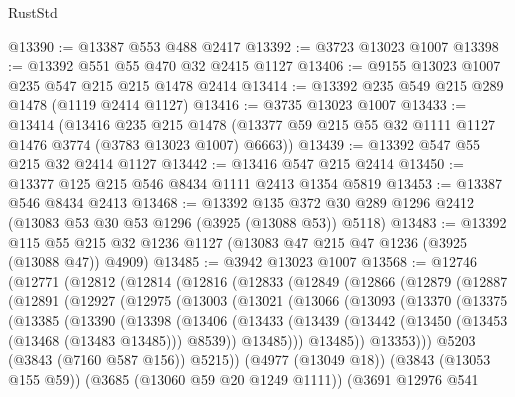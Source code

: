 \begin{lexlean}{RustStd}
\begin{coremodule}
@13390 := @13387 @553 @488 @2417
@13392 := @3723 @13023 @1007
@13398 := @13392 @551 @55 @470 @32 @2415 @1127
@13406 := @9155 @13023 @1007 @235 @547 @215 @215 @1478 @2414
@13414 := @13392 @235 @549 @215 @289 @1478 (@1119 @2414 @1127)
@13416 := @3735 @13023 @1007
@13433 := @13414
    (@13416
      @235
      @215
      @1478
      (@13377 @59 @215 @55 @32 @1111 @1127 @1476 @3774 (@3783 @13023 @1007) @6663))
@13439 := @13392 @547 @55 @215 @32 @2414 @1127
@13442 := @13416 @547 @215 @2414
@13450 := @13377 @125 @215 @546 @8434 @1111 @2413 @1354 @5819
@13453 := @13387 @546 @8434 @2413
@13468 := @13392
    @135
    @372
    @30
    @289
    @1296
    @2412
    (@13083 @53 @30 @53 @1296 (@3925 (@13088 @53)) @5118)
@13483 := @13392
    @115
    @55
    @215
    @32
    @1236
    @1127
    (@13083 @47 @215 @47 @1236 (@3925 (@13088 @47)) @4909)
@13485 := @3942 @13023 @1007
@13568 := @12746
    (@12771
      (@12812
        (@12814
          (@12816
            (@12833
              (@12849
                (@12866
                  (@12879
                    (@12887
                      (@12891
                        (@12927
                          (@12975
                            (@13003
                              (@13021
                                (@13066
                                  (@13093
                                    (@13370
                                      (@13375
                                        (@13385
                                          (@13390
                                            (@13398
                                              (@13406
                                                (@13433
                                                  (@13439
                                                    (@13442
                                                      (@13450
                                                        (@13453 (@13468 (@13483 @13485)))
                                                        @8539))
                                                    @13485)))
                                              @13485))
                                          @13353)))
                                    @5203
                                    (@3843 (@7160 @587 @156))
                                    @5215))
                                (@4977 (@13049 @18))
                                (@3843 (@13053 @155 @59))
                                (@3685 (@13060 @59 @20 @1249 @1111))
                                (@3691
                                  @12976
                                  @541

\end{coremodule}
\end{lexlean}
